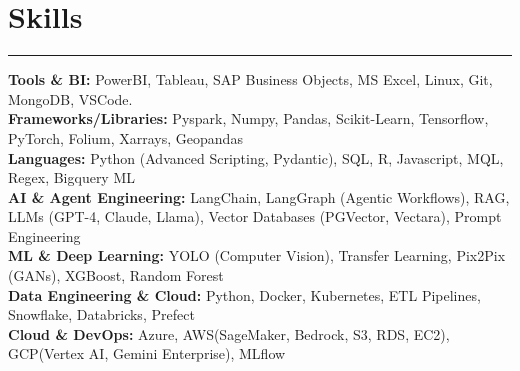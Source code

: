 \documentclass[10pt]{article}
\begin{document}
\section*{Skills}
\noindent %
\rule{\textwidth}{0.4pt}
\textbf{Tools \& BI:} PowerBI, Tableau, SAP Business Objects, MS Excel, Linux, Git, MongoDB, VSCode. \\
\textbf{Frameworks/Libraries:} Pyspark, Numpy, Pandas, Scikit-Learn, Tensorflow, PyTorch, Folium, Xarrays, Geopandas \\
\textbf{Languages:} Python (Advanced Scripting, Pydantic), SQL, R, Javascript, MQL, Regex, Bigquery ML\\
\textbf{AI \& Agent Engineering:} LangChain, LangGraph (Agentic Workflows), RAG, LLMs (GPT-4, Claude, Llama), Vector Databases (PGVector, Vectara), Prompt Engineering \\
\textbf{ML \& Deep Learning:} YOLO (Computer Vision), Transfer Learning, Pix2Pix (GANs), XGBoost, Random Forest\\
\textbf{Data Engineering \& Cloud:} Python, Docker, Kubernetes, ETL Pipelines, Snowflake, Databricks, Prefect\\
\textbf{Cloud \& DevOps:} Azure, AWS(SageMaker, Bedrock, S3, RDS, EC2), GCP(Vertex AI, Gemini Enterprise), MLflow
\vspace{5pt}
\end{document}
